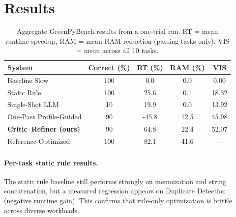 \documentclass{article}
\begin{document}
\section{Results}

\begin{table}[h]
\centering
\caption{Aggregate GreenPyBench results from a one-trial run. RT = mean runtime speedup, RAM = mean RAM reduction (passing tasks only). VIS = mean across all 10 tasks.}
\label{tab:results}
\small
\begin{tabular}{lcccc}
\toprule
\textbf{System} & \textbf{Correct (\%)} & \textbf{RT (\%)} & \textbf{RAM (\%)} & \textbf{VIS} \\
\midrule
Baseline Slow                   & 100 & 0.0  & 0.0  & 0.00 \\
Static Rule                     & 100 & 25.6 & 0.1  & 18.32 \\
Single-Shot LLM                 & 10  & 19.9  & 0.0  & 13.92 \\
One-Pass Profile-Guided         & 90  & -45.8 & 12.5 & 45.98 \\
\textbf{Critic--Refiner (ours)} & 90  & 64.8  & 22.4 & 52.07 \\
Reference Optimized             & 100 & 82.1 & 41.6 & --- \\
\bottomrule
\end{tabular}
\end{table}

\paragraph{Per-task static rule results.} The static rule baseline still performs strongly on memoization and string concatenation, but a measured regression appears on Duplicate Detection (negative runtime gain). This confirms that rule-only optimization is brittle across diverse workloads.
\end{document}
